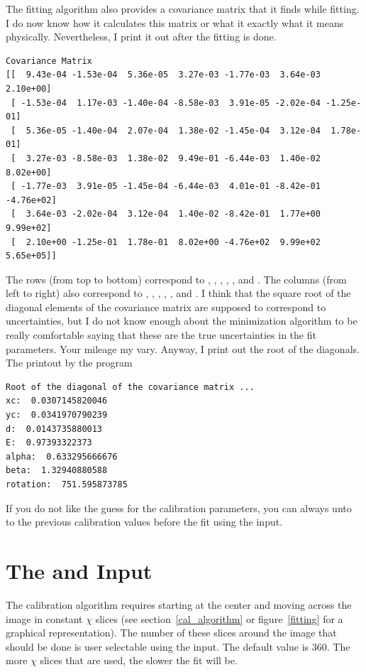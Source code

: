 The fitting algorithm also provides a covariance matrix that it finds
while fitting. I do now know how it calculates this matrix or what
it exactly what it means physically. Nevertheless, I print it out after the
fitting is done. 
\begin{lstlisting}[caption={Display of A Covariance Matrix},
    basicstyle=\ttfamily\footnotesize]
Covariance Matrix
[[  9.43e-04 -1.53e-04  5.36e-05  3.27e-03 -1.77e-03  3.64e-03  2.10e+00]
 [ -1.53e-04  1.17e-03 -1.40e-04 -8.58e-03  3.91e-05 -2.02e-04 -1.25e-01]
 [  5.36e-05 -1.40e-04  2.07e-04  1.38e-02 -1.45e-04  3.12e-04  1.78e-01]
 [  3.27e-03 -8.58e-03  1.38e-02  9.49e-01 -6.44e-03  1.40e-02  8.02e+00]
 [ -1.77e-03  3.91e-05 -1.45e-04 -6.44e-03  4.01e-01 -8.42e-01 -4.76e+02]
 [  3.64e-03 -2.02e-04  3.12e-04  1.40e-02 -8.42e-01  1.77e+00  9.99e+02]
 [  2.10e+00 -1.25e-01  1.78e-01  8.02e+00 -4.76e+02  9.99e+02  5.65e+05]]
\end{lstlisting}
The rows (from top to bottom) correspond to , , 
, , , and . The columns
(from left to right) also correspond to , , 
, , , and . I think that the
square root of the diagonal elements of the covariance matrix are supposed to 
correspond to uncertainties, but I do not know enough about the minimization
algorithm to be really comfortable saying that these are the true uncertainties in
the fit parameters. Your mileage my vary. Anyway, I print out the root of the 
diagonals. The printout by the program  
\begin{lstlisting}[caption={Display of the root of the diagonals}]
Root of the diagonal of the covariance matrix ... 
xc:  0.0307145820046
yc:  0.0341970790239
d:  0.0143735880013
E:  0.97393322373
alpha:  0.633295666676
beta:  1.32940880588
rotation:  751.595873785
\end{lstlisting}
    
If you do not like the guess for the calibration 
parameters, you can always unto to the previous
calibration values before the fit using the
 input.

\section{\texorpdfstring{The  
        and  Input}{The Number of 
        Chi and Stddev Inputs}}

The calibration algorithm requires starting
at the center and moving across the image in constant
$\chi$ slices (see section~\ref{cal_algorithm} or 
figure~\ref{fitting} for a graphical representation).
The number of these slices around the image that
should be done is user selectable using the 
 input. The default value is 360.
The more $\chi$ slices that are used, the slower
the fit will be.

